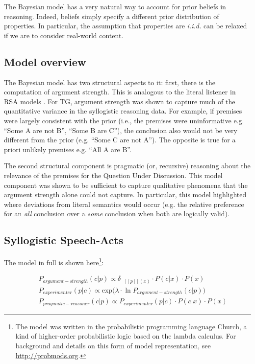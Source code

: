 \documentclass{llncs} %
\newcommand{\denote}[1]{\mbox{ $[\![ #1 ]\!]$}}
\begin{document}
The Bayesian model has a very natural way to account for prior beliefs in reasoning. Indeed, beliefs simply specify a different prior distribution of properties. In particular, the assumption that properties are \emph{i.i.d.} can be relaxed if we are to consider real-world content.

\subsection{Model overview}

The Bayesian model has two structural aspects to it: first, there is the computation of argument strength. This is analogous to the literal listener in RSA models \cite{Frank2012,Goodman2013}. For TG,  argument strength was shown to capture much of the quantitative variance in the syllogistic reasoning data. For example, if premises were largely consistent with the prior (i.e., the premises were uninformative e.g. ``Some A are not B'', ``Some B are C''), the conclusion also would not be very different from the prior (e.g. ``Some C are not A''). The opposite is true for a priori unlikely premises e.g. ``All A are B''.  

The second structural component is pragmatic (or, recursive) reasoning about the relevance of the premises for the Question Under Discussion. This model component was shown to be sufficient to capture qualitative phenomena that the argument strength alone could not capture. In particular, this model highlighted where deviations from literal semantics would occur (e.g. the relative preference for an \emph{all} conclusion over a \emph{some} conclusion when both are logically valid). 


\subsection{Syllogistic Speech-Acts}

The model in full is shown here\footnote{The model was written in the probabilistic programming language Church\cite{probmods}, a kind of higher-order probabilistic logic based on the lambda calculus. For background and details on this form of model representation, see \url{http://probmods.org}.}:

\begin{eqnarray}
&&P_{argument-strength}(c|p)\propto \delta_{\denote{p}(x)} \cdot P(c|x)  \cdot P(x)  \label{eq:L0}\\ %
&&P_{experimenter}(p|c) \propto \mathrm{exp}({\lambda \cdot \ln P_{argument-strength}(c|p))}  \label{eq:S1}\\ 
&&P_{pragmatic-reasoner}(c|p)\propto P_{experimenter}(p|c)\cdot P(c|x)  \cdot P(x)  \label{eq:L1}
\end{eqnarray}
\end{document}
